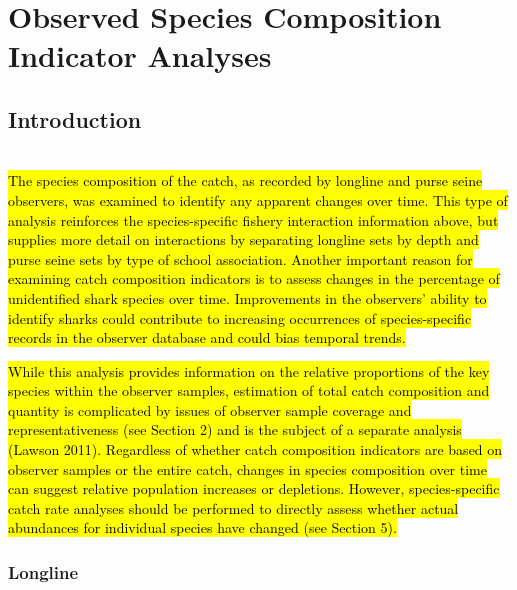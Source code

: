 \documentclass[12pt]{SCreport}
\begin{document}
      
\section{Observed Species Composition Indicator Analyses}

 \subsection{Introduction}
 \\

\hl{The species composition of the catch, as recorded by longline and purse seine observers, was examined to identify any apparent changes over time. This type of analysis reinforces the species-specific fishery interaction information above, but supplies more detail on interactions by separating longline sets by depth and purse seine sets by type of school association. Another important reason for examining catch composition indicators is to assess changes in the percentage of unidentified shark species over time. Improvements in the observers' ability to identify sharks could contribute to increasing occurrences of species-specific records in the observer database and could bias temporal trends.}

\hl{While this analysis provides information on the relative proportions of the key species within the observer samples, estimation of total catch composition and quantity is complicated by issues of observer sample coverage and representativeness (see Section 2) and is the subject of a separate analysis (Lawson 2011). Regardless of whether catch composition indicators are based on observer samples or the entire catch, changes in species composition over time can suggest relative population increases or depletions. However, species-specific catch rate analyses should be performed to directly assess whether actual abundances for individual species have changed (see Section 5).}
     
      
  \subsubsection{Longline}  
  
\end{document}
